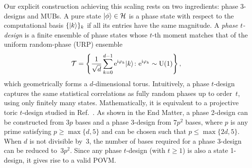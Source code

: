 \documentclass[aps,pra,twocolumn,nofootinbib,superscriptaddress,10pt]{revtex4-2}
\DeclarePairedDelimiter{\ket}{\lvert}{\rangle}
\newcommand{\caH}{\mathcal{H}}
\newcommand{\caT}{\mathcal{T}}
\newcommand{\rme}{\mathrm{e}}
\newcommand{\rmi}{\mathrm{i}}
\newcommand{\rmU}{\mathrm{U}}
\newcommand{\rcite}[1]{Ref.~\cite{#1}}
\begin{document}
Our explicit construction achieving this scaling rests on two ingredients: phase 3-designs and MUBs. A pure state $\ket{\phi}\in \caH$ is a phase state with respect to the computational basis $\{\ket{k}\}_k$ if all its entries have the same magnitude. A \emph{phase $t$-design}  is a finite ensemble of phase states whose $t$-th moment matches that of the uniform random-phase (URP) ensemble
\begin{equation}\label{eq:URPmain}
	\caT = \left\{\frac{1}{\sqrt{d}}\sum_{k=0}^{d-1}\rme^{\rmi\varphi_k}\ket{k}\colon \rme^{\rmi\varphi_k}\sim \rmU(1)\right\},
\end{equation}
which geometrically forms a $d$-dimensional torus. Intuitively, a phase $t$-design captures the same statistical correlations as fully random phases up to order~$t$, using only finitely many states. Mathematically, it is equivalent to a projective toric $t$-design studied in \rcite{Iosue24}. 
As shown in the End Matter, a phase 2-design can be constructed from $3p$ bases and a phase 3-design from $7p^2$ bases, where $p$ is any prime satisfying $p \geq \max\{d,5\}$ and can be chosen such that $p \leq \max\{2d,5\}$. When $d$ is not divisible by~$3$, the number of bases required for a phase 3-design can be reduced to~$3p^2$.
Since any phase $t$-design (with $t\geq 1$) is also a state 1-design, it gives rise to a valid POVM.
\end{document}

